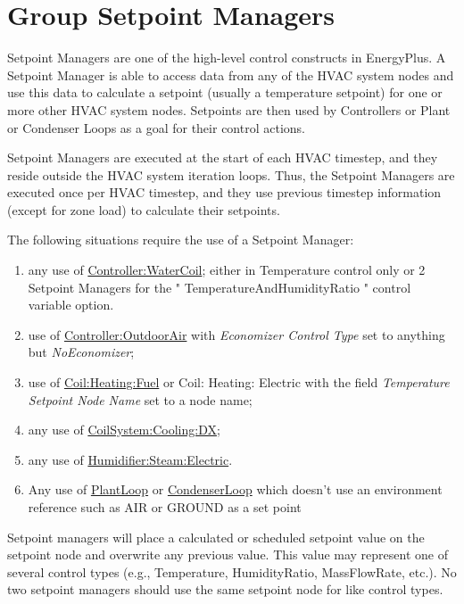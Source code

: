 \section{Group Setpoint Managers}\label{group-setpoint-managers}

Setpoint Managers are one of the high-level control constructs in EnergyPlus. A Setpoint Manager is able to access data from any of the HVAC system nodes and use this data to calculate a setpoint (usually a temperature setpoint) for one or more other HVAC system nodes. Setpoints are then used by Controllers or Plant or Condenser Loops as a goal for their control actions.

Setpoint Managers are executed at the start of each HVAC timestep, and they reside outside the HVAC system iteration loops. Thus, the Setpoint Managers are executed once per HVAC timestep, and they use previous timestep information (except for zone load) to calculate their setpoints.

The following situations require the use of a Setpoint Manager:

\begin{enumerate}
\def\labelenumi{\arabic{enumi})}
\item
  any use of \hyperref[controllerwatercoil]{Controller:WaterCoil}; either in Temperature control only or 2 Setpoint Managers for the " TemperatureAndHumidityRatio " control variable option.
\item
  use of \hyperref[controlleroutdoorair]{Controller:OutdoorAir} with \emph{Economizer Control Type} set to anything but \emph{NoEconomizer};
\item
  use of \hyperref[coilheatinggas-000]{Coil:Heating:Fuel} or Coil: Heating: Electric with the field \emph{Temperature Setpoint Node Name} set to a node name;
\item
  any use of \hyperref[coilsystemcoolingdx]{CoilSystem:Cooling:DX};
\item
  any use of \hyperref[humidifiersteamelectric]{Humidifier:Steam:Electric}.
\item
  Any use of \hyperref[plantloop]{PlantLoop} or \hyperref[condenserloop]{CondenserLoop} which doesn't use an environment reference such as AIR or GROUND as a set point
\end{enumerate}

Setpoint managers will place a calculated or scheduled setpoint value on the setpoint node and overwrite any previous value. This value may represent one of several control types (e.g., Temperature, HumidityRatio, MassFlowRate, etc.). No two setpoint managers should use the same setpoint node for like control types.

